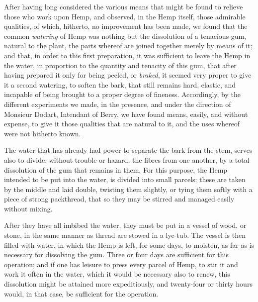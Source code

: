 \documentclass[a4paper, 11pt, oneside, polutonikogreek, english]{article}
\begin{document}
After having long considered the various means that might be found to relieve those who work upon Hemp, and observed, in the Hemp itself, those admirable qualities, of which, hitherto, no improvement has been made, we found that the common \emph{watering} of Hemp was nothing but the dissolution of a tenacious gum, natural to the plant, the parts whereof are joined together merely by means of it; and that, in order to this first preparation, it was sufficient to leave the Hemp in the water, in proportion to the quantity and tenacity of this gum, that after having prepared it only for being peeled, or \emph{braked}, it seemed very proper to give it a second watering, to soften the bark, that still remains hard, elastic, and incapable of being brought to a proper degree of fineness. Accordingly, by the different experiments we made, in the presence, and under the direction of Monsieur Dodart, Intendant of Berry, we have found means, easily, and without expense, to give it those qualities that are natural to it, and the uses whereof were not hitherto known.

The water that has already had power to separate the bark from the stem, serves also to divide, without trouble or hazard, the fibres from one another, by a total dissolution of the gum that remains in them. For this purpose, the Hemp intended to be put into the water, is divided into small parcels; these are taken by the middle and laid double, twisting them slightly, or tying them softly with a piece of strong packthread, that so they may be stirred and managed easily without mixing.

After they have all imbibed the water, they must be put in a vessel of wood, or stone, in the same manner as thread are stowed in a lye-tub. The vessel is then filled with water, in which the Hemp is left, for some days, to moisten, as far as is necessary for dissolving the gum. Three or four days are sufficient for this operation; and if one has leisure to press every parcel of Hemp, to stir it and work it often in the water, which it would be necessary also to renew, this dissolution might be attained more expeditiously, and twenty-four or thirty hours would, in that case, be sufficient for the operation.
\end{document}

